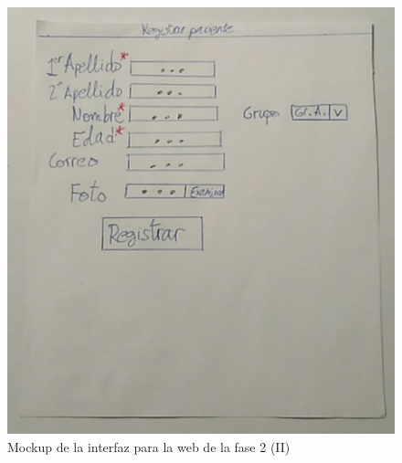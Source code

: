 \begin{figure}[!htbp]
    \centering
    \includegraphics[scale=0.3]{Imagenes/anxA3.jpg}
    \caption[Mockup de la interfaz para la web de la fase 1 (II)]{Mockup de la interfaz para la web de la fase 2 (II)}
    \label{fig:mockup3}
\end{figure}

